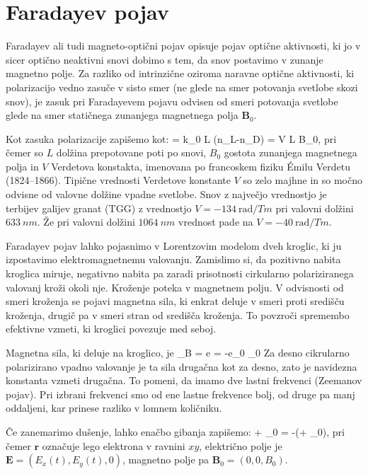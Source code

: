 \section{Faradayev pojav}
Faradayev ali tudi magneto-optični pojav opisuje pojav optične aktivnosti, ki jo v sicer
optično neaktivni snovi dobimo s tem, da snov postavimo v zunanje magnetno polje. Za razliko 
od intrinzične oziroma naravne optične aktivnosti, ki polarizacijo vedno zasuče v sisto smer (ne 
glede na smer potovanja svetlobe skozi snov), je zasuk pri Faradayevem pojavu odvisen od smeri 
potovanja svetlobe glede na smer statičnega zunanjega magnetnega polja $\mathbf{B}_0$. 

Kot zasuka polarizacije zapišemo kot:
\beq
\Delta \varphi = k_0 L (n_L-n_D) = V L B_0,
\label{eq:09_51}
\eeq
pri čemer so $L$ dolžina prepotovane poti po snovi, $B_0$ gostota zunanjega magnetnega polja in
$V$ Verdetova konstakta, imenovana po francoskem fiziku \'{E}milu Verdetu (1824--1866).
Tipične vrednosti Verdetove konstante $V$ so zelo majhne in so močno odvisne od valovne dolžine
vpadne svetlobe. Snov z največjo vrednostjo je terbijev galijev granat (TGG) z vrednostjo 
$V = -134~\si{\radian}/\si{Tm}$ pri valovni dolžini $633~\si{nm}$. Že pri valovni dolžini
$1064~\si{nm}$ vrednost pade na $V = -40~\si{\radian}/\si{Tm}$.

Faradayev pojav lahko pojasnimo v Lorentzovim modelom dveh kroglic, ki ju izpostavimo elektromagnetnemu
valovanju. Zamislimo si, da pozitivno nabita kroglica miruje, negativno nabita pa zaradi prisotnosti
cirkularno polariziranega valovanj kroži okoli nje. Kroženje poteka v magnetnem polju. V odvisnosti
od smeri kroženja se pojavi magnetna sila, ki enkrat deluje v smeri proti središču kroženja, drugič
pa v smeri stran od središča kroženja. To povzroči spremembo efektivne vzmeti, ki kroglici povezuje med seboj. 

Magnetna sila, ki deluje na kroglico, je 
\beq
{}_B = e \times {} = -e_0 \times {}_0 
\label{eq:09_52}
\eeq
Za desno cikrularno polarizirano vpadno valovanje je ta sila drugačna kot za desno, zato je navidezna
konstanta vzmeti drugačna. To pomeni, da imamo dve lastni frekvenci (Zeemanov pojav). Pri izbrani
frekvenci smo od ene lastne frekvence bolj, od druge pa manj oddaljeni, kar prinese razliko v lomnem
količniku. 

Če zanemarimo dušenje, lahko enačbo gibanja zapišemo:
\beq
{} + \omega_0  = -\left(+ \times {}_0\right),
\label{eq:09_53}
\eeq
pri čemer $\mathbf{r}$ označuje lego elektrona v ravnini $xy$, električno polje je $\mathbf{E} = (E_x(t), E_y(t), 0)$, 
magnetno polje pa $\mathbf{B}_0 = (0, 0, B_0)$.

